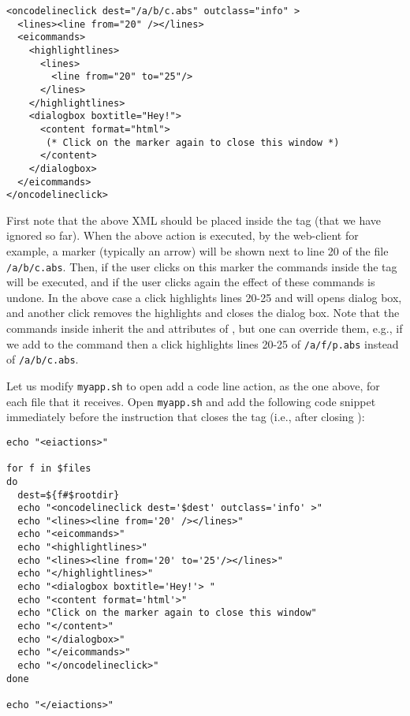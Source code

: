 \medskip
\begin{lstlisting}
<oncodelineclick dest="/a/b/c.abs" outclass="info" >
  <lines><line from="20" /></lines>
  <eicommands>
    <highlightlines>
      <lines>
        <line from="20" to="25"/>
      </lines>
    </highlightlines>
    <dialogbox boxtitle="Hey!"> 
      <content format="html">
       (* Click on the marker again to close this window *)
      </content>
    </dialogbox>
  </eicommands>
</oncodelineclick>
\end{lstlisting}

\medskip
\noindent
First note that the above XML should be placed inside the
 tag (that we have ignored so far).
%
When the above action is executed, by the web-client for example, a
marker (typically an arrow) will be shown next to line 20 of the file
\texttt{/a/b/c.abs}.
%
Then, if the user clicks on this marker the commands inside the
 tag will be executed, and if the user clicks again
the effect of these commands is undone.
%
In the above case a click highlights lines 20-25 and will opens dialog
box, and another click removes the highlights and closes the dialog
box.
%
Note that the commands inside  inherit the 
and  attributes of , but one can
override them, e.g., if we add  to the
 command then a click highlights lines 20-25 of
\texttt{/a/f/p.abs} instead of \texttt{/a/b/c.abs}.
%

Let us modify \texttt{myapp.sh} to open add a code line action, as the
one above, for each file that it receives. Open \texttt{myapp.sh} and
add the following code snippet immediately before the instruction that
closes the  tag (i.e., after closing ):

\medskip
\begin{lstlisting}[style=script]
echo "<eiactions>"

for f in $files 
do
  dest=${f#$rootdir}
  echo "<oncodelineclick dest='$dest' outclass='info' >"
  echo "<lines><line from='20' /></lines>"
  echo "<eicommands>"
  echo "<highlightlines>"
  echo "<lines><line from='20' to='25'/></lines>"
  echo "</highlightlines>"
  echo "<dialogbox boxtitle='Hey!'> "
  echo "<content format='html'>"
  echo "Click on the marker again to close this window"
  echo "</content>"
  echo "</dialogbox>"
  echo "</eicommands>"
  echo "</oncodelineclick>"
done

echo "</eiactions>"
\end{lstlisting}


